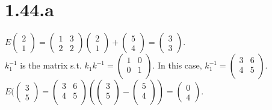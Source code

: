 \documentclass{article}
\begin{document}
\section*{1.44.a}
$E\left(\begin{smallmatrix}2\\1\end{smallmatrix}\right) =
\left(\begin{smallmatrix}1 & 3\\ 2 & 2\end{smallmatrix}\right)
\left(\begin{smallmatrix}2\\1\end{smallmatrix}\right) + 
\left(\begin{smallmatrix}5\\4\end{smallmatrix}\right) =
\left(\begin{smallmatrix}3\\3\end{smallmatrix}\right)$.\\
$k_1^{-1}$ is the matrix s.t. $k_1k^{-1} =
\left(\begin{smallmatrix}1 & 0\\ 0 & 1\\\end{smallmatrix}\right)$.
In this case, $k_1^{-1} = \left(\begin{smallmatrix}3 & 6\\ 4 & 5\\\end{smallmatrix}\right)$.\\
$E(\left(\begin{smallmatrix}3\\5\end{smallmatrix}\right) = 
\left(\begin{smallmatrix}3 & 6\\4 & 5\\\end{smallmatrix}\right)(
\left(\begin{smallmatrix}3\\5\\\end{smallmatrix}\right) - 
\left(\begin{smallmatrix}5\\4\\\end{smallmatrix}\right)) =
\left(\begin{smallmatrix}0\\4\end{smallmatrix}\right)$.
\end{document}
